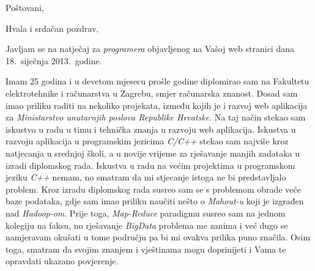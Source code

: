 \documentclass[11pt,a4paper,sans]{moderncv}   %
\begin{document}

\clearpage
\date{}
\opening{Poštovani,}
\closing{Hvala i srdačan pozdrav,}
\makelettertitle

Javljam se na natječaj za \textit{programera} objavljenog na Vašoj web stranici dana 18.~siječnja 2013.~godine.

Imam 25 godina i u devetom mjesecu prošle godine diplomirao sam na Fakultetu elektrotehnike i računarstva u Zagrebu, smjer računarska znanost. Dosad sam imao priliku raditi na nekoliko projekata, između kojih je i razvoj web aplikacija za \textit{Ministarstvo unutarnjih poslova Republike Hrvatske}. Na taj način stekao sam iskustvo u radu u timu i tehnička znanja u razvoju web aplikacija. Iskustva u razvoju aplikacija u programskim jezicima \textit{C/C++} stekao sam najviše kroz natjecanja u srednjoj školi, a u novije vrijeme za rješavanje manjih zadataka u izradi diplomskog rada. Iskustva u radu na većim projektima u programskom jeziku \textit{C++} nemam, no smatram da mi stjecanje istoga ne bi predstavljalo problem. Kroz izradu diplomskog rada susreo sam se s problemom obrade veće baze podataka, gdje sam imao priliku naučiti nešto o \textit{Mahout-u} koji je izgrađen nad \textit{Hadoop-om}. Prije toga, \textit{Map-Reduce} paradigmu susreo sam na jednom kolegiju na faksu, no rješavanje \textit{BigData} problema me zanima i već dugo se namjeravam okušati u tome području pa bi mi ovakva prilika puno značila. Osim toga, smatram da svojim znanjem i vještinama mogu doprinijeti i Vama te opravdati ukazano povjerenje. 

\makeletterclosing

\end{document}
